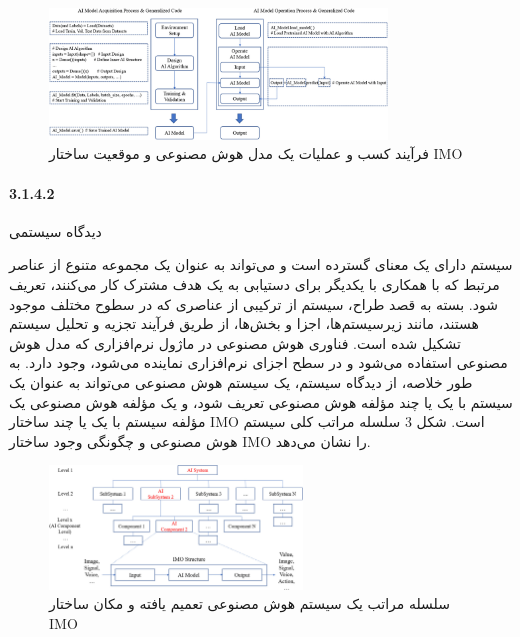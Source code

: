 \documentclass[a4paper,10pt]{article}
\begin{document}
                \begin{figure}[htbp]

                    \centering
                    \includegraphics[width=0.8\textwidth]{image/fig 2.png}
                    \caption{فرآیند کسب و عملیات یک مدل هوش مصنوعی و موقعیت ساختار IMO}
                    \label{fig:fig_2}
                
                \end{figure}

            \paragraph{3.1.4.2}{دیدگاه سیستمی}

                سیستم دارای یک معنای گسترده است و می‌تواند به عنوان یک مجموعه متنوع از عناصر مرتبط که با همکاری با یکدیگر برای دستیابی به یک هدف مشترک کار می‌کنند، تعریف شود. بسته به قصد طراح، سیستم از ترکیبی از عناصری که در سطوح مختلف موجود هستند، مانند زیرسیستم‌ها، اجزا و بخش‌ها، از طریق فرآیند تجزیه و تحلیل سیستم تشکیل شده است. فناوری هوش مصنوعی در ماژول نرم‌افزاری که مدل هوش مصنوعی استفاده می‌شود و در سطح اجزای نرم‌افزاری نماینده می‌شود، وجود دارد. به طور خلاصه، از دیدگاه سیستم، یک سیستم هوش مصنوعی می‌تواند به عنوان یک سیستم با یک یا چند مؤلفه هوش مصنوعی تعریف شود، و یک مؤلفه هوش مصنوعی یک مؤلفه سیستم با یک یا چند ساختار IMO است. شکل 3 سلسله مراتب کلی سیستم هوش مصنوعی و چگونگی وجود ساختار IMO را نشان می‌دهد.

                \begin{figure}[htbp]

                    \centering
                    \includegraphics[width=0.6\textwidth]{image/fig 3.png}
                    \caption{سلسله مراتب یک سیستم هوش مصنوعی تعمیم یافته و مکان ساختار IMO}
                    \label{fig:fig_3}
                
                \end{figure}
\end{document}
